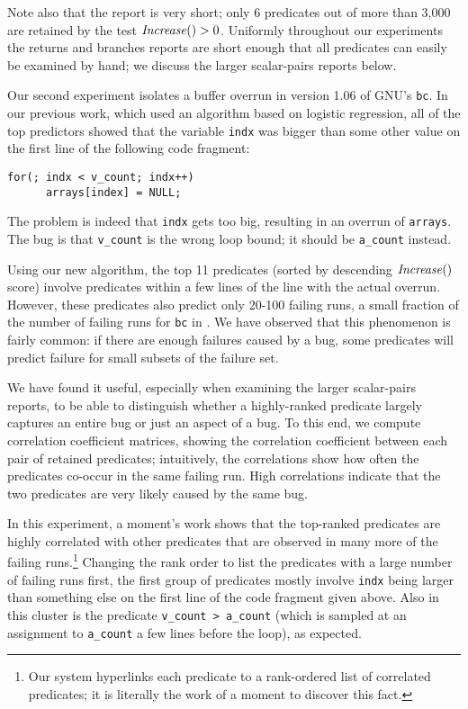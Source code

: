 Note also that the report is very short; only 6 predicates out of more than 3,000 are retained by the test $\mbox{\textit{Increase}}() > 0$.
Uniformly throughout our experiments the returns and branches reports are short enough that all predicates can
easily be examined by hand; we discuss the larger scalar-pairs reports below.

Our second experiment isolates a buffer overrun in version 1.06 of GNU's {\tt bc}.  In our
previous work, which used an algorithm based on logistic regression, all of the top
predictors showed that the variable {\tt indx} was bigger than some other value on the first line of the following
code fragment:
\begin{verbatim}
for(; indx < v_count; indx++)
      arrays[index] = NULL;
\end{verbatim}
The problem is indeed that {\tt indx} gets too big, resulting in an overrun of {\tt arrays}.  The bug
is that {\tt v\_count} is the wrong loop bound; it should be {\tt a\_count} instead.  

Using our new algorithm, the top 11 predicates (sorted by descending
$\mbox{\textit{Increase}}()$ score) involve predicates within a few lines of the line
with the actual overrun.  However, these predicates also predict only
20-100 failing runs, a small fraction of the number of failing runs
for {\tt bc} in .  We have observed that this
phenomenon is fairly common: if there are enough failures caused by a
bug, some predicates will predict failure for small subsets of the failure set.

We have found it useful, especially when examining the larger
scalar-pairs reports, to be able to distinguish whether a
highly-ranked predicate largely captures an entire bug or just an aspect of a bug.  To
this end, we compute correlation coefficient matrices, showing the correlation coefficient between each pair of retained predicates; 
intuitively, the
correlations show how often the predicates co-occur in the same failing run.  High correlations
indicate that the two predicates are very likely caused by the same bug.

In this experiment, a moment's work shows that the top-ranked predicates are highly
correlated with other predicates that are observed in many more of the
failing runs.\footnote{Our system hyperlinks each predicate to a
rank-ordered list of correlated predicates; it is literally the work
of a moment to discover this fact.}  Changing the rank order to list
the predicates with a large number of failing runs first, the first
group of predicates mostly involve {\tt indx} being larger than
something else on the first line of the code fragment given above.
Also in this cluster is the predicate {\tt v\_count > a\_count} (which is sampled at an assignment
to {\tt a\_count} a few lines before the loop), as
expected.

